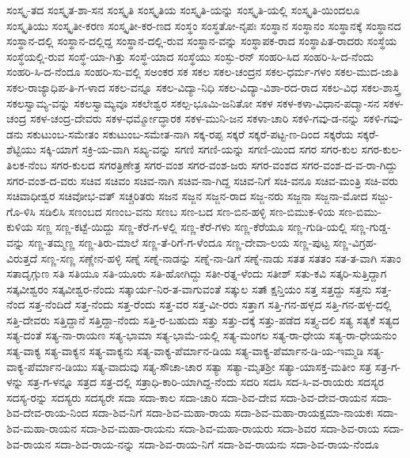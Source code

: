 ಸಂಸ್ಕೃ-ತದ
ಸಂಸ್ಕೃತ-ಶಾ-ಸನ
ಸಂಸ್ಕೃತಿ
ಸಂಸ್ಕೃತಿಯ
ಸಂಸ್ಕೃತಿ-ಯನ್ನು
ಸಂಸ್ಕೃತಿ-ಯಲ್ಲಿ
ಸಂಸ್ಕೃತಿ-ಯಿಂದಲೂ
ಸಂಸ್ಕೃತಿಯು
ಸಂಸ್ಕೃತೀ-ಕರಣ
ಸಂಸ್ಕೃತೀ-ಕರ-ಣದ
ಸಂಸ್ಥಂ
ಸಂಸ್ಥತೋ-ನೃಪಃ
ಸಂಸ್ಥಾನ
ಸಂಸ್ಥಾನಂ
ಸಂಸ್ಥಾನಕ್ಕೆ
ಸಂಸ್ಥಾನದ
ಸಂಸ್ಥಾನ-ದಲ್ಲಿ
ಸಂಸ್ಥಾನ-ದಲ್ಲಿದ್ದ
ಸಂಸ್ಥಾನ-ದಲ್ಲಿ-ರುವ
ಸಂಸ್ಥಾನ-ವನ್ನು
ಸಂಸ್ಥಾಪಕ-ರಾದ
ಸಂಸ್ಥಾಪಿತ-ರಾದರು
ಸಂಸ್ಥೆಯ
ಸಂಸ್ಥೆಯಲ್ಲಿ-ರುವ
ಸಂಸ್ಥೆ-ಯಾ-ಗಿತ್ತು
ಸಂಸ್ಥೆ-ಯಾದ
ಸಂಸ್ಥೆಯು
ಸಂಸ್ಫು-ರನ್
ಸಂಹರಿ-ಸಿದ
ಸಂಹರಿ-ಸಿ-ದ-ನೆಂದು
ಸಂಹರಿ-ಸಿ-ದ-ನೆಂದೂ
ಸಂಹರಿ-ಸು-ವಲ್ಲಿ
ಸಅಂಕರ
ಸಕ
ಸಕಲ
ಸಕಲ-ಚಂದ್ರನ
ಸಕಲ-ಧರ್ಮ-ಗಳಂ
ಸಕಲ-ಮುದ-ಜಾತಿ
ಸಕಲ-ರಾಜ್ಯಾಧಿಪ-ತಿ-ಗ-ಳಾದ
ಸಕಲ-ವನ್ನೂ
ಸಕಲ-ವಿದ್ಯಾ-ನಿಧಿ
ಸಕಲ-ವಿದ್ಯಾ-ವಿಶಾ-ರದ-ರಾದ
ಸಕಲ-ವಿಧ
ಸಕಲ-ಶಾಸ್ತ್ರ
ಸಕಲಸ್ವಾಮ್ಯ-ವನ್ನು
ಸಕಲಸ್ವಾಮ್ಯವೂ
ಸಕಲೇಶ್ವರ
ಸಕಲ್ಪ-ಭೂಮಿ-ಜನಿತೋ
ಸಕಳ
ಸಕಳ-ಕಳಾ-ವಿಧಾನ-ಪದ್ಮಾ-ಸನ
ಸಕಳ-ಚಂದ್ರ
ಸಕಳ-ಚಂದ್ರ-ದೇವರು
ಸಕಳ-ಧರ್ಮ್ಮೋದ್ಧಾರಕ
ಸಕಳ-ಮುನಿ-ಜನ
ಸಕಳಾ-ಚಾರಿ
ಸಕಳಿ-ಗವು-ಡ-ನನ್ನು
ಸಕಳಿ-ಗವು-ಡನು
ಸಕುಟುಂಬ-ಸಮೇತಂ
ಸಕುಟುಂಬ-ಸಮೇತ-ನಾಗಿ
ಸಕ್ಕ-ರಪ್ಪ
ಸಕ್ಕರೆ
ಸಕ್ಕರೆ-ಪಟ್ಟ-ಣ-ದಿಂದ
ಸಕ್ಕರೆಯ
ಸಕ್ಕರೆ-ಶೆಟ್ಟಿಯು
ಸಕ್ಕಿ-ಯಾಗೆ
ಸಕ್ರಿ-ಯ-ವಾಗಿ
ಸಖ್ಯ-ವನ್ನು
ಸಗಣಿ
ಸಗಣಿ-ಯನ್ನು
ಸಗಣಿ-ಯಿಂದ
ಸಗರ
ಸಗರ-ಕುಲ
ಸಗರ-ಕುಲ-ತಿಲಕ-ನೆಂಬ
ಸಗರ-ಕುಲದ
ಸಗರತ್ರಿಣೇತ್ರ
ಸಗರ-ವಂಶ
ಸಗರ-ವಂಶ-ಜರು
ಸಗರ-ವಂಶದ
ಸಗರ-ವಂಶ-ದ-ವ-ರಾ-ಗಿದ್ದು
ಸಗರ-ವಂಶ-ದ-ವರು
ಸಚಿವ
ಸಚಿವಂ
ಸಚಿವ-ನಾಗಿ
ಸಚಿವ-ನಾ-ಗಿದ್ದ
ಸಚಿವ-ನಿಗೆ
ಸಚಿ-ವನೂ
ಸಚಿವ-ಮಂತ್ರಿ
ಸಚಿ-ವರು
ಸಚಿವಾಧೀಶ್ವರ
ಸಚಿವೋಭ-ವತ್
ಸಚ್ಚರಿತರು
ಸಜನ
ಸಜ್ಜನ
ಸಜ್ಜನ-ರಾದ
ಸಜ್ಜ-ನರು
ಸಜ್ಜನಾ
ಸಜ್ಜನಾ-ಮೋದ
ಸಜ್ಜು-ಗೊ-ಳಿಸಿ
ಸಡಿಲಿಸಿ
ಸಣಂಬದ
ಸಣಂಬ-ವನು
ಸಣಬ
ಸಣ-ಬದ
ಸಣ-ಬಿನ-ಹಳ್ಳಿ
ಸಣ-ಬಿಮುಕ-ಳಿಯ
ಸಣ-ಬಿಮು-ಕುಳಿಯ
ಸಣ್ಣ
ಸಣ್ಣ-ಕಟ್ಟೆ-ಯಿದ್ದು
ಸಣ್ಣ-ಕೆರೆ-ಗ-ಳಲ್ಲಿ
ಸಣ್ಣ-ಕೆರೆ-ಗಳು
ಸಣ್ಣ-ಕೆರೆಯೂ
ಸಣ್ಣ-ಗುಡಿ-ಯಲ್ಲಿ
ಸಣ್ಣ-ಗುಡ್ಡ-ವನ್ನು
ಸಣ್ಣ-ತಮ್ಮಣ್ಣ
ಸಣ್ಣ-ತಿರು-ಮಾಲೆ
ಸಣ್ಣ-ತೆ-ರಿಗೆ-ಗ-ಳೆಂದೂ
ಸಣ್ಣ-ದೇವಾ-ಲಯ
ಸಣ್ಣ-ಪುಟ್ಟ
ಸಣ್ಣ-ವಿಗ್ರಹ-ವಿರುತ್ತದೆ
ಸಣ್ಣ-ಸಣ್ಣ
ಸಣ್ಣೇನ-ಹಳ್ಳಿ
ಸಣ್ನೆ
ಸಣ್ನೆ-ನಾಡನ್ನು
ಸಣ್ನೆ-ನಾ-ಡಿಗೆ
ಸಣ್ನೆ-ನಾಡು
ಸತತ
ಸತತಂ
ಸತ-ತ-ವಾಗಿ
ಸತಾಂ
ಸತಾದೃಗ್ಗುಣ
ಸತಿ
ಸತಿಯೂ
ಸತಿ-ಯೂರು
ಸತಿ-ಹೋಗಿದ್ದು
ಸತೀ-ರತ್ನ-ಳೆಂದು
ಸತೀಶ್
ಸತು-ಕವಿ
ಸತ್ಕರಿ-ಸುತ್ತಿದ್ದಾಗ
ಸತ್ಕವೀಶ್ವರಂ
ಸತ್ಕವೀಶ್ವರ-ನೆಂದು
ಸತ್ಕಾರ್ಯ-ನಿರ-ತ-ವಾಗುವಂತೆ
ಸತ್ಕುಲ
ಸತ್ಕ್ಷಾನ್ತಿಯಂ
ಸತ್ತ
ಸತ್ತದ್ದು
ಸತ್ತನು
ಸತ್ತ-ನೆಂದ
ಸತ್ತ-ನೆಂದಿದೆ
ಸತ್ತ-ನೆಂದು
ಸತ್ತ-ರೆಂದು
ಸತ್ತ-ವರ
ಸತ್ತ-ವೀ-ರರು
ಸತ್ತಾಗ
ಸತ್ತಿ-ಗನ-ಹಳ್ಳದ
ಸತ್ತಿ-ಗನ-ಹಳ್ಳ-ದಲ್ಲಿ
ಸತ್ತಿ-ದೇವರು
ಸತ್ತಿದ್ದಾನೆ
ಸತ್ತಿದ್ದಾ-ನೆಂದು
ಸತ್ತಿ-ರ-ಬಹುದು
ಸತ್ತು
ಸತ್ತು-ದಕ್ಕೆ
ಸತ್ತು-ಪಡೆದ
ಸತ್ತ್ಯ-ದಲಿ
ಸತ್ಯ
ಸತ್ಯಕೆ
ಸತ್ಯದ
ಸತ್ಯ-ದಂತೆ
ಸತ್ಯ-ನಾ-ರಾಯಣ
ಸತ್ಯ-ಭಾಮಾ
ಸತ್ಯ-ಭಾಮೆ-ಯಲ್ಲಿ
ಸತ್ಯ-ಮಂಗಲ
ಸತ್ಯ-ರಾ-ಧೇಯ
ಸತ್ಯ-ರಾ-ಧೇಯನುಂ
ಸತ್ಯ-ವಾಕ್ಯ
ಸತ್ಯ-ವಾಕ್ಯನ
ಸತ್ಯ-ವಾಕ್ಯನು
ಸತ್ಯ-ವಾಕ್ಯ-ಪೆರ್ಮಾನ-ಡಿಯ
ಸತ್ಯ-ವಾಕ್ಯ-ಪೆರ್ಮಾನ-ಡಿ-ಯ-ಇಮ್ಮಡಿ
ಸತ್ಯ-ವಾಕ್ಯ-ಪೆರ್ಮಾನ-ಡಿಯು
ಸತ್ಯ-ವಾದುವು
ಸತ್ಯ-ಸೌಚಾ-ಚಾರ
ಸತ್ಯಾ
ಸತ್ಯಾ-ಮೃತಶ್ರೀ
ಸತ್ಯಾ-ಯಾಸಕ್ತ-ಮತೀಂ
ಸತ್ರ
ಸತ್ರ-ಗ-ಳನ್ನು
ಸತ್ರ-ಗ-ಳನ್ನೂ
ಸತ್ರದ
ಸತ್ರ-ದಲ್ಲಿ
ಸತ್ರಾಧಿ-ಕಾರಿ-ಯಾಗಿದ್ದ-ನೆಂದು
ಸದರಿ
ಸದಸಿ
ಸದ-ಸಿ-ವ-ರಾಯರು
ಸದಸ್ಯರ
ಸದಸ್ಯ-ರನ್ನು
ಸದಸ್ಯರು
ಸದಸ್ಯರೇ
ಸದಾ
ಸದಾ-ಕಾಲ
ಸದಾ-ಚಾರಿ
ಸದಾ-ಶಿವ-ದೇವ
ಸದಾ-ಶಿವ-ದೇವ-ರಾಯನ
ಸದಾ-ಶಿವ-ದೇವ-ರಾಯ-ನಿಂದ
ಸದಾ-ಶಿವ-ನಿಗೆ
ಸದಾ-ಶಿವ-ಮಹಾ-ರಾಯ
ಸದಾ-ಶಿವ-ಮಹಾ-ರಾಯಕ್ಷಮಾ-ನಾಯಕಃ
ಸದಾ-ಶಿವ-ಮಹಾ-ರಾಯನ
ಸದಾ-ಶಿವ-ಮಹಾ-ರಾಯನು
ಸದಾ-ಶಿವ-ಮಹಾ-ರಾಯರು
ಸದಾ-ಶಿವರ
ಸದಾ-ಶಿವ-ರಾಯ
ಸದಾ-ಶಿವ-ರಾಯನ
ಸದಾ-ಶಿವ-ರಾಯ-ನನ್ನು
ಸದಾ-ಶಿವ-ರಾಯ-ನಿಗೆ
ಸದಾ-ಶಿವ-ರಾಯನು
ಸದಾ-ಶಿವ-ರಾಯ-ನೆಂದೂ
